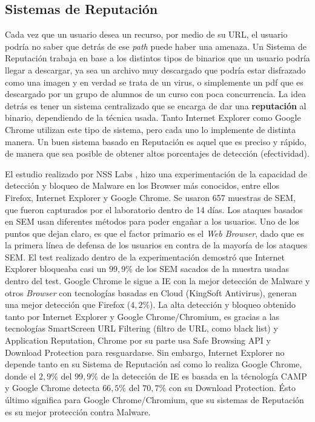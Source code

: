  \subsection{Sistemas de Reputación}
    Cada vez que un usuario desea un recurso, por medio de su URL, el usuario podría no saber que detrás de ese \textit{path} puede haber una amenaza. Un Sistema de Reputación trabaja en base a los distintos tipos de binarios que un usuario podría llegar a descargar, ya sea un archivo muy descargado que podría estar disfrazado como una imagen y en verdad se trata de un virus, o simplemente un pdf que es descargado por un grupo de alumnos de un curso con poca concurrencia. La idea detrás es tener un sistema centralizado que se encarga de dar una \textbf{reputación} al binario, dependiendo de la técnica usada. Tanto Internet Explorer como Google Chrome utilizan este tipo de sistema, pero cada uno lo implemente de distinta manera. Un buen sistema basado en Reputación es aquel que es preciso y rápido, de manera que sea posible de obtener altos porcentajes de detección (efectividad).

    El estudio realizado por NSS Labs \cite{rowSecSEMBlock}, hizo una experimentación de la capacidad de detección y bloqueo de Malware en los Browser más conocidos, entre ellos Firefox, Internet Explorer y Google Chrome. Se usaron 657 muestras de SEM, que fueron capturados por el laboratorio dentro de 14 días. Los ataques basados en SEM usan diferentes métodos para poder engañar a los usuarios. Uno de los puntos que dejan claro, es que el factor primario es el \textit{Web Browser}, dado que es la primera línea de defensa de los usuarios en contra de la mayoría de los ataques SEM. El test realizado dentro de la experimentación demostró que Internet Explorer bloqueaba casi un \(99,9\%\) de los SEM sacados de la muestra usadas dentro del test. Google Chrome le sigue a IE con la mejor detección de Malware y otros \textit{Browser} con tecnologías basadas en Cloud (KingSoft Antivirus), generan una mejor detección que Firefox (\(4,2\%\)). La alta detección y bloqueo obtenido tanto por Internet Explorer y Google Chrome/Chromium, es gracias a las tecnologías SmartScreen URL Filtering (filtro de URL, como black list) y Application Reputation, Chrome por su parte usa Safe Browsing API y Download Protection para resguardarse. Sin embargo, Internet Explorer no depende tanto en su Sistema de Reputación así como lo realiza Google Chrome, donde el \(2,9\%\) del \(99,9\%\) de la detección de IE es basada en la técnología CAMP y Google Chrome detecta \(66,5\%\) del \(70,7\%\) con su Download Protection. Ésto último significa para Google Chrome/Chromium, que su sistemas de Reputación es su mejor protección contra Malware. 

